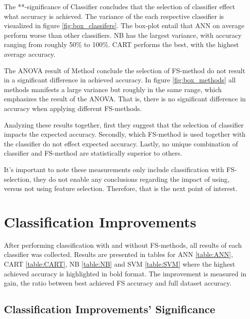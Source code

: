 

The **-significance of Classifier concludes that the selection of classifier effect what accuracy is achieved. The variance of the each respective classifier is visualized in figure \ref{fig:box_classifers}. The box-plot entail that ANN on average perform worse than other classifiers. NB has the largest variance, with accuracy ranging from roughly 50\% to 100\%. CART performs the best, with the highest average accuracy.

The ANOVA result of Method conclude the selection of FS-method do not result in a significant difference in achieved accuracy. In figure \ref{fig:box_methods} all methods manifests a large variance but roughly in the same range, which emphasizes the result of the ANOVA. That is, there is no significant difference in accuracy when applying different FS-methods.

Analyzing these results together, first they suggest that the selection of classifier impacts the expected accuracy. Secondly, which FS-method is used together with the classifier do not effect expected accuracy. Lastly, no unique combination of classifier and FS-method are statistically superior to others.

It's important to note these measurements only include classification with FS-selection, they do not enable any conclusions regarding the impact of using, versus not using feature selection. Therefore, that is the next point of interest.



\FloatBarrier
\section{Classification Improvements}

After performing classification with and without FS-methods, all results of each classifier was collected. Results are presented in tables for ANN \ref{table:ANN}, CART \ref{table:CART}, NB \ref{table:NB} and SVM \ref{table:SVM} where the highest achieved accuracy is highlighted in bold format. The improvement is measured in gain, the ratio between best achieved FS accuracy and full dataset accuracy.



\FloatBarrier
\subsection{Classification Improvements' Significance}
\label{sec:Investigation_improvement}

